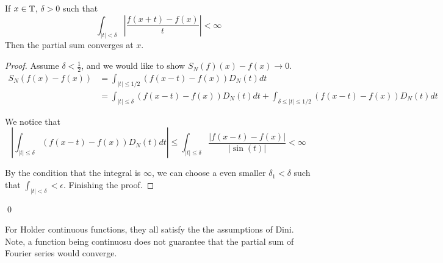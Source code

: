 \begin{theorem}
    If $x\in\mathbb{T}$, $\delta>0$ such that
    \begin{equation*}
        \int_{|t|<\delta}\left|\frac{f(x+t)-f(x)}{t} \right|<\infty
    \end{equation*}
    Then the partial sum converges at $x$.
\end{theorem}
\begin{proof}
    Assume $\delta<\frac{1}{2}$, and we would like to show $S_N(f)(x)-f(x)\to 0$.
    \begin{align*}
        S_N(f(x)-f(x))&=\int_{|t|\leq1/2}(f(x-t)-f(x))D_N(t)dt\\
        &=\int_{|t|\leq\delta}(f(x-t)-f(x))D_N(t)dt+\int_{\delta\leq|t|\leq1/2}(f(x-t)-f(x))D_N(t)dt
    \end{align*}

    We notice that
    \begin{equation*}
        \left|\int_{|t|\leq\delta}(f(x-t)-f(x))D_N(t)dt\right|\leq\int_{|t|\leq\delta}\frac{|f(x-t)-f(x)|}{|\sin(t)|}<\infty
    \end{equation*}

    By the condition that the integral is $\infty$, we can choose a even smaller $\delta_1<\delta$ such that $\int_{|t|<\delta}<\epsilon$. Finishing the proof.
\end{proof}
\qed

\begin{remark}
     For Holder continuous functions, they all satisfy the the assumptions of Dini. Note, a function being continuosu does not guarantee that the partial sum of Fourier series would converge.
\end{remark}


